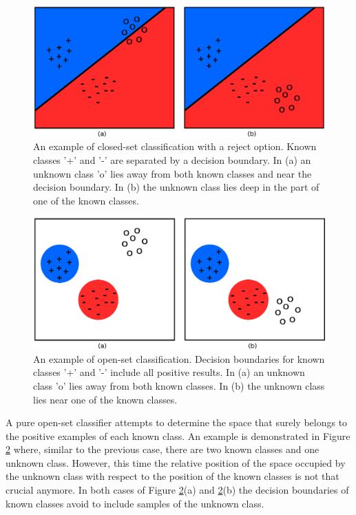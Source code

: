 \begin{figure}[t]
	\begin{center}
    	\includegraphics[scale=0.70]{Figures/closed-set_classification_schema.eps}
		\caption{An example of closed-set classification with a reject option. Known classes '+' and '-' are separated by a decision boundary. In (a) an unknown class 'o' lies away from both known classes and near the decision boundary. In (b) the unknown class lies deep in the part of one of the known classes.}
		\label{chap:openset:fig:closed_set_classification}
	\end{center}
\end{figure}


\begin{figure}[t]
	\begin{center}
    	\includegraphics[scale=0.70]{Figures/open-set_classification_schema.eps}
		\caption{An example of open-set classification. Decision boundaries for known classes '+' and '-' include all positive results. In (a) an unknown class 'o' lies away from both known classes. In (b) the unknown class lies near one of the known classes.}
		\label{chap:openset:fig:open_set_classification}
	\end{center}
\end{figure}

A pure open-set classifier attempts to determine the space that surely belongs to the positive examples of each known class. An example is demonstrated in Figure \ref{chap:openset:fig:open_set_classification} where, similar to the previous case, there are two known classes and one unknown class. However, this time the relative position of the space occupied by the unknown class with respect to the position of the known classes is not that crucial anymore. In both cases of Figure \ref{chap:openset:fig:open_set_classification}(a) and \ref{chap:openset:fig:open_set_classification}(b) the decision boundaries of known classes avoid to include samples of the unknown class.

